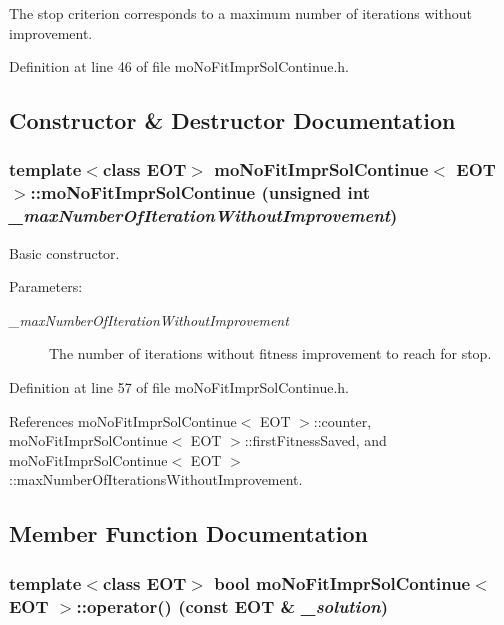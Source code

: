 The stop criterion corresponds to a maximum number of iterations without improvement. 



Definition at line 46 of file mo\-No\-Fit\-Impr\-Sol\-Continue.h.

\subsection{Constructor \& Destructor Documentation}
\subsubsection{\setlength{\rightskip}{0pt plus 5cm}template$<$class EOT$>$ {\bf mo\-No\-Fit\-Impr\-Sol\-Continue}$<$ EOT $>$::{\bf mo\-No\-Fit\-Impr\-Sol\-Continue} (unsigned int {\em \_\-max\-Number\-Of\-Iteration\-Without\-Improvement})\hspace{0.3cm}{\tt  [inline]}}\label{classmo_no_fit_impr_sol_continue_a0}


Basic constructor. 

\begin{Desc}
\item[Parameters:]
\begin{description}
\item[{\em \_\-max\-Number\-Of\-Iteration\-Without\-Improvement}]The number of iterations without fitness improvement to reach for stop. \end{description}
\end{Desc}


Definition at line 57 of file mo\-No\-Fit\-Impr\-Sol\-Continue.h.

References mo\-No\-Fit\-Impr\-Sol\-Continue$<$ EOT $>$::counter, mo\-No\-Fit\-Impr\-Sol\-Continue$<$ EOT $>$::first\-Fitness\-Saved, and mo\-No\-Fit\-Impr\-Sol\-Continue$<$ EOT $>$::max\-Number\-Of\-Iterations\-Without\-Improvement.

\subsection{Member Function Documentation}
\subsubsection{\setlength{\rightskip}{0pt plus 5cm}template$<$class EOT$>$ bool {\bf mo\-No\-Fit\-Impr\-Sol\-Continue}$<$ EOT $>$::operator() (const EOT \& {\em \_\-solution})\hspace{0.3cm}{\tt  [inline, virtual]}}\label{classmo_no_fit_impr_sol_continue_a1}


